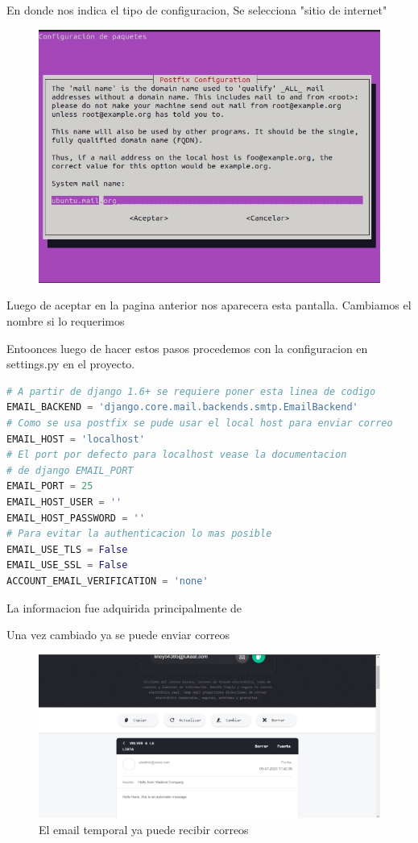 \documentclass{article}
\begin{document}
En donde nos indica el tipo de configuracion, Se selecciona "sitio de internet"

\begin{figure}[!h]
    \centering
    \includegraphics[scale=1.5]{img/postfix3.jpg}
    \caption{}
    \label{fig:enter-label}
\end{figure}

Luego de aceptar en la pagina anterior nos aparecera esta pantalla. Cambiamos el nombre si lo requerimos

Entoonces luego de hacer estos pasos procedemos con la configuracion en settings.py en el proyecto.

\begin{lstlisting}[language=Python]
# A partir de django 1.6+ se requiere poner esta linea de codigo 
EMAIL_BACKEND = 'django.core.mail.backends.smtp.EmailBackend'
# Como se usa postfix se pude usar el local host para enviar correo
EMAIL_HOST = 'localhost'
# El port por defecto para localhost vease la documentacion 
# de django EMAIL_PORT
EMAIL_PORT = 25
EMAIL_HOST_USER = ''
EMAIL_HOST_PASSWORD = ''
# Para evitar la authenticacion lo mas posible
EMAIL_USE_TLS = False
EMAIL_USE_SSL = False
ACCOUNT_EMAIL_VERIFICATION = 'none'
\end{lstlisting}

La informacion fue adquirida principalmente de \cite{conection_refused}

Una vez cambiado ya se puede enviar correos 

\begin{figure}[!h]
    \centering
    \includegraphics[scale=1]{img/TempEmailEmailGet.jpg}
    \caption{El email temporal ya puede recibir correos}
    \label{fig:enter-label}
\end{figure}
\end{document}
